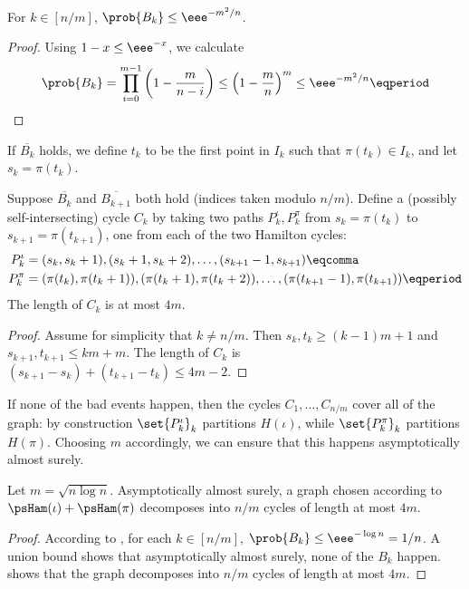 \begin{lemma} \label{lem:b-prob}
 For $k \in [n/m]$, $\prob{B_k} \leq \eee^{-m^2/n}$.
\end{lemma}
\begin{proof}
 Using $1-x \leq \eee^{-x}$, we calculate
\begin{equation}
 \prob{B_k} = \prod_{i=0}^{m-1} \left(1 - \frac{m}{n-i}\right) \leq \left(1 - \frac{m}{n}\right)^m \leq \eee^{-m^2/n} \eqperiod \qedhere
\end{equation}
\end{proof}

If $\overline{B_k}$ holds, we define $t_k$ to be the first point in $I_k$ such that $\pi(t_k) \in I_k$, and let $s_k = \pi(t_k)$.

\begin{lemma} \label{lem:cycle}
 Suppose $\overline{B_k}$ and $\overline{B_{k+1}}$ both hold (indices taken modulo $n/m$). Define a (possibly self-intersecting) cycle $C_k$ by taking two paths $P_k^\iota,P_k^\pi$ from $s_k = \pi(t_k)$ to $s_{k+1} = \pi(t_{k+1})$, one from each of the two Hamilton cycles:
\begin{align*}
 P_k^\iota &= (s_k,s_k+1),(s_k+1,s_k+2),\ldots,(s_{k+1}-1,s_{k+1}) \eqcomma \\
 P_k^\pi &= (\pi(t_k),\pi(t_k+1)),(\pi(t_k+1),\pi(t_k+2)),\ldots,(\pi(t_{k+1}-1),\pi(t_{k+1})) \eqperiod
\end{align*}
 The length of $C_k$ is at most $4m$.
\end{lemma}
\begin{proof}
 Assume for simplicity that $k \neq n/m$. Then $s_k,t_k \geq (k-1)m + 1$ and $s_{k+1},t_{k+1} \leq km + m$. The length of $C_k$ is $(s_{k+1} - s_k) + (t_{k+1} - t_k) \leq 4m-2$.
\end{proof}

If none of the bad events happen, then the cycles $C_1,\ldots,C_{n/m}$ cover all of the graph: by construction $\set{P_k^\iota}_k$ partitions $H(\iota)$, while $\set{P_k^\pi}_k$ partitions $H(\pi)$. Choosing $m$ accordingly, we can ensure that this happens asymptotically almost surely.

\begin{lemma} \label{lem:partition}
 Let $m = \sqrt{n\log n}$. Asymptotically almost surely, a graph chosen according to $\psHam(\iota) + \psHam(\pi)$ decomposes into $n/m$ cycles of %
 length at most $4m$.
\end{lemma}
\begin{proof}
 According to , for each $k \in [n/m]$, $\prob{B_k} \leq \eee^{-\log n} = 1/n$. A union bound shows that asymptotically almost surely, none of the $B_k$ happen.  shows that the graph decomposes into $n/m$ cycles of %
 length at most $4m$.
\end{proof}

